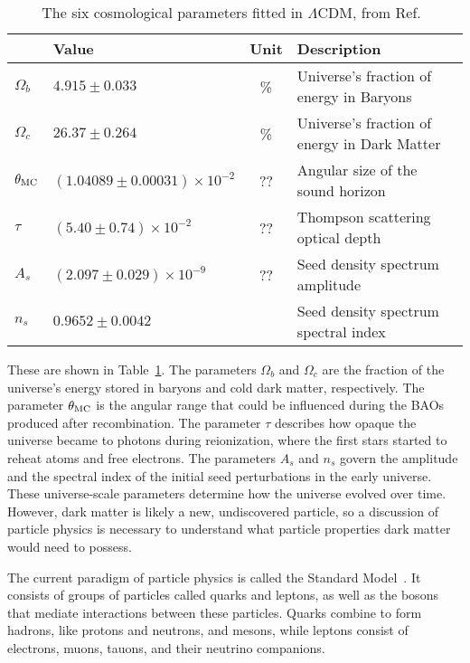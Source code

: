   \begin{table}[]
    \centering
    \caption[6 Cosmological Parameters]{
      The six cosmological parameters fitted in $\Lambda$CDM, from Ref.~\cite{planck_dm_limit}}
    \label{tab:six_params}
    \begin{tabular}{llcl}
               & \textbf{Value}                 & \textbf{Unit} & \textbf{Description} \\
    \hline 
    $\Omega_b$ & $ 4.915  \pm0.033                 $ & \%   & Universe's fraction of energy in Baryons \\
    $\Omega_c$ & $ 26.37  \pm0.264                 $ & \%   & Universe's fraction of energy in Dark Matter \\
    $\theta_{\textrm{MC}}$ & $(1.04089\pm0.00031)\times 10^{-2}$ & {\color{red}??}   & Angular size of the sound horizon \\
    $\tau$     & $(5.40   \pm0.74   )\times 10^{-2}$ & {\color{red}??}   & Thompson scattering optical depth \\
    $A_s$      & $(2.097  \pm0.029  )\times 10^{-9}$ & {\color{red}??}   & Seed density spectrum amplitude \\
    $n_s$      & $ 0.9652 \pm0.0042                $ &      & Seed density spectrum spectral index \\
    \hline 
    \end{tabular}
  \end{table}
  
  These are shown in Table~\ref{tab:six_params}.
  The parameters $\Omega_b$ and $\Omega_c$ are the fraction of the universe's energy stored in baryons and cold dark matter, respectively.
  The parameter $\theta_{\textrm{MC}}$ is the angular range that could be influenced during the BAOs produced after recombination.
  The parameter $\tau$ describes how opaque the universe became to photons during reionization, where the first stars started to reheat atoms and free electrons.
  The parameters $A_s$ and $n_s$ govern the amplitude and the spectral index of the initial seed perturbations in the early universe.
  These universe-scale parameters determine how the universe evolved over time.
  However, dark matter is likely a new, undiscovered particle,  so a discussion of particle physics is necessary to understand what particle properties dark matter would need to possess.
  

  The current paradigm of particle physics is called the Standard Model~\cite{standardmodel}.
  It consists of groups of particles called quarks and leptons, as well as the bosons that mediate interactions between these particles.
  Quarks combine to form hadrons, like protons and neutrons, and mesons, while leptons consist of electrons, muons, tauons, and their neutrino companions.

